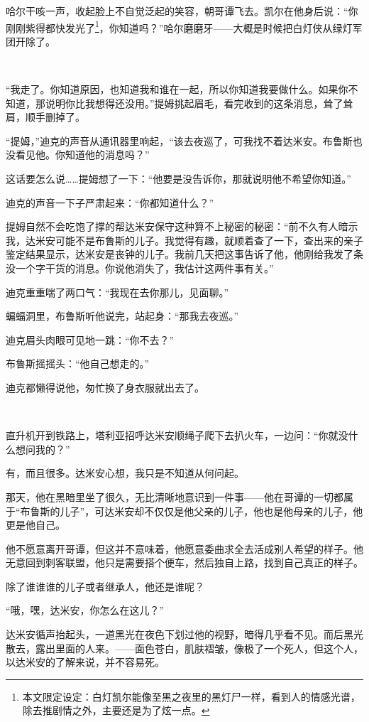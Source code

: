 \documentclass[../main]{subfiles}
\begin{document}
哈尔干咳一声，收起脸上不自觉泛起的笑容，朝哥谭飞去。凯尔在他身后说：“你刚刚紫得都快发光了\footnote[1]{本文限定设定：白灯凯尔能像至黑之夜里的黑灯尸一样，看到人的情感光谱，除去推剧情之外，主要还是为了炫一点。}，你知道吗？”哈尔磨磨牙——大概是时候把白灯侠从绿灯军团开除了。

~\

“我走了。你知道原因，也知道我和谁在一起，所以你知道我要做什么。如果你不知道，那说明你比我想得还没用。”提姆挑起眉毛，看完收到的这条消息，耸了耸肩，顺手删掉了。

“提姆，”迪克的声音从通讯器里响起，“该去夜巡了，可我找不着达米安。布鲁斯也没看见他。你知道他的消息吗？”

这话要怎么说……提姆想了一下：“他要是没告诉你，那就说明他不希望你知道。”

迪克的声音一下子严肃起来：“你都知道什么？”

提姆自然不会吃饱了撑的帮达米安保守这种算不上秘密的秘密：“前不久有人暗示我，达米安可能不是布鲁斯的儿子。我觉得有趣，就顺着查了一下，查出来的亲子鉴定结果显示，达米安是丧钟的儿子。我前几天把这事告诉了他，他刚给我发了条没一个字干货的消息。你说他消失了，我估计这两件事有关。”

迪克重重喘了两口气：“我现在去你那儿，见面聊。”

蝙蝠洞里，布鲁斯听他说完，站起身：“那我去夜巡。”

迪克眉头肉眼可见地一跳：“你不去？”

布鲁斯摇摇头：“他自己想走的。”

迪克都懒得说他，匆忙换了身衣服就出去了。

~\

直升机开到铁路上，塔利亚招呼达米安顺绳子爬下去扒火车，一边问：“你就没什么想问我的？”

有，而且很多。达米安心想，我只是不知道从何问起。

那天，他在黑暗里坐了很久，无比清晰地意识到一件事——他在哥谭的一切都属于“布鲁斯的儿子”，可达米安却不仅仅是他父亲的儿子，他也是他母亲的儿子，他更是他自己。

他不愿意离开哥谭，但这并不意味着，他愿意委曲求全去活成别人希望的样子。他无意回到刺客联盟，他只是需要搭个便车，然后独自上路，找到自己真正的样子。

除了谁谁谁的儿子或者继承人，他还是谁呢？

“哦，嘿，达米安，你怎么在这儿？”

达米安循声抬起头，一道黑光在夜色下划过他的视野，暗得几乎看不见。而后黑光散去，露出里面的人来。——面色苍白，肌肤褶皱，像极了一个死人，但这个人，以达米安的了解来说，并不容易死。
\end{document}
